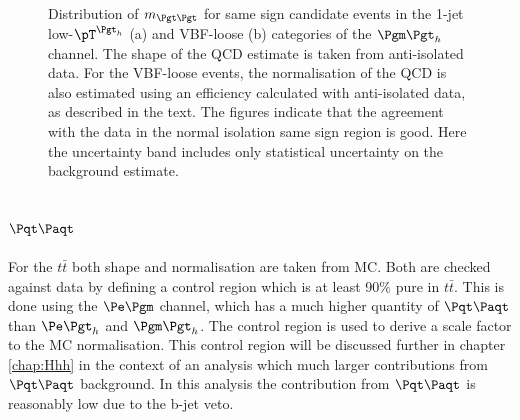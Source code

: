 \begin{figure}[htb]
\caption[Distribution of $m_{\Pgt\Pgt}$ for same sign candidate events in the
1-jet low-$\pT^{\Pgth}$ (a) and VBF-loose (b) categories of the $\mutau$
channel.]{Distribution of $m_{\Pgt\Pgt}$ for same sign candidate events in the
1-jet low-$\pT^{\Pgth}$ (a) and VBF-loose (b) categories of the $\mutau$
channel. The shape of the QCD estimate is taken from anti-isolated data. For the
VBF-loose events, the normalisation of the QCD is also estimated using an efficiency
calculated with anti-isolated data, as described in the text. 
The figures indicate that the agreement with the data in the normal isolation same sign region is good. 
Here the uncertainty band includes only statistical uncertainty on the
background estimate.}
\label{fig:samesign}
\end{figure}

\subsection{$\ttbar$}
\label{sec:backgroundEstimation_TT}

For the $t \bar{t}$ both shape and normalisation are taken from \ac{MC}. Both are checked
against data by defining a control region which is at least 90$\%$ pure in
$t \bar{t}$. This is done using the $\emu$ channel, which has a much higher
quantity of $\ttbar$ than $\etau$ and $\mutau$. The control region is used to
derive a scale factor to the \ac{MC} normalisation. This control region will be
discussed further in chapter \ref{chap:Hhh} in the context of an analysis which
much larger contributions from $\ttbar$ background. In this analysis the
contribution from $\ttbar$ is reasonably low due to the b-jet veto.

